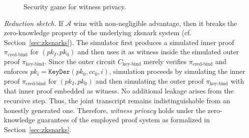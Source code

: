 \begin{figure}[t]
	\centering
	\begin{gameproof}[name=\mathsf{Exp}^{\mathsf{WP}}, arg=(1^{\lambda}), nr=0]
		\makeatletter
		\renewcommand\@pc@gametitle[1][]{\ensuremath{\pcgame[\mathcal{A}]\gameprocedurearg}}
		\makeatother
	\end{gameproof}
	\caption{Security game for witness privacy.}
	\label{fig:game-witness-privacy}
\end{figure}

\medskip
\textit{Reduction sketch.}
If $\mathcal{A}$ wins with non-negligible advantage, then it breaks the zero-knowledge property of the underlying \acrshort{zksnark} system (cf. Section~\ref{sec:zksnarks}). The simulator first produces a simulated inner proof $\pi_{\text{cred-bind}}$ for $(pk_I, pk_0)$ and then uses it as witness inside the simulated outer proof $\pi_{\text{key-bind}}$. Since the outer circuit $C_{\text{key-bind}}$ merely verifies $\pi_{\text{cred-bind}}$ and enforces $pk_i=\texttt{KeyDer}(pk_0, cc_0, i)$, simulation proceeds by simulating the inner proof $\pi_{\text{cred-bind}}$ for $(pk_I, pk_0)$ and then simulating the outer proof $\pi_{\text{key-bind}}$ with that inner proof embedded as witness. No additional leakage arises from the recursive step. Thus, the joint transcript remains indistinguishable from an honestly generated one. Therefore, \emph{witness privacy} holds under the zero-knowledge guarantees of the employed proof system as formalized in Section~\ref{sec:zksnarks}.

